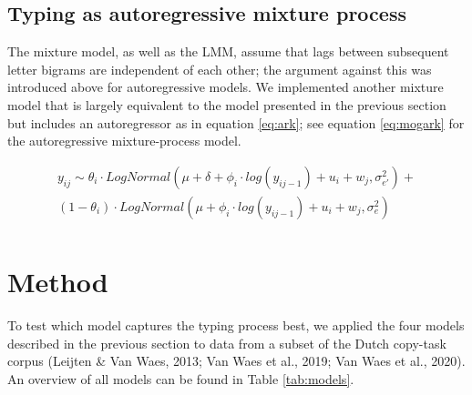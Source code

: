 \documentclass[
  english,
  man,mask,floatsintext]{apa7}
\begin{document}
\hypertarget{typing-as-autoregressive-mixture-process}{%
\subsection{Typing as autoregressive mixture process}\label{typing-as-autoregressive-mixture-process}}

The mixture model, as well as the LMM, assume that lags between subsequent letter bigrams are independent of each other; the argument against this was introduced above for autoregressive models. We implemented another mixture model that is largely equivalent to the model presented in the previous section but includes an autoregressor as in equation \ref{eq:ark}; see equation \ref{eq:mogark} for the autoregressive mixture-process model.

\[
\tag{8}
\begin{aligned}
    y_{ij} \sim \theta_i \cdot LogNormal(\mu + \delta + \phi_i \cdot log(y_{ij-1}) + u_i + w_j, \sigma_{e'}^2) +\\
        (1 - \theta_i) \cdot LogNormal(\mu + \phi_i \cdot log(y_{ij-1}) + u_i + w_j, \sigma_{e}^2)\\
\end{aligned}   
\label{eq:mogark}
\]

\hypertarget{method}{%
\section{Method}\label{method}}

To test which model captures the typing process best, we applied the four models described in the previous section to data from a subset of the Dutch copy-task corpus (Leijten \& Van Waes, 2013; Van Waes et al., 2019; Van Waes et al., 2020). An overview of all models can be found in Table \ref{tab:models}.
\end{document}
